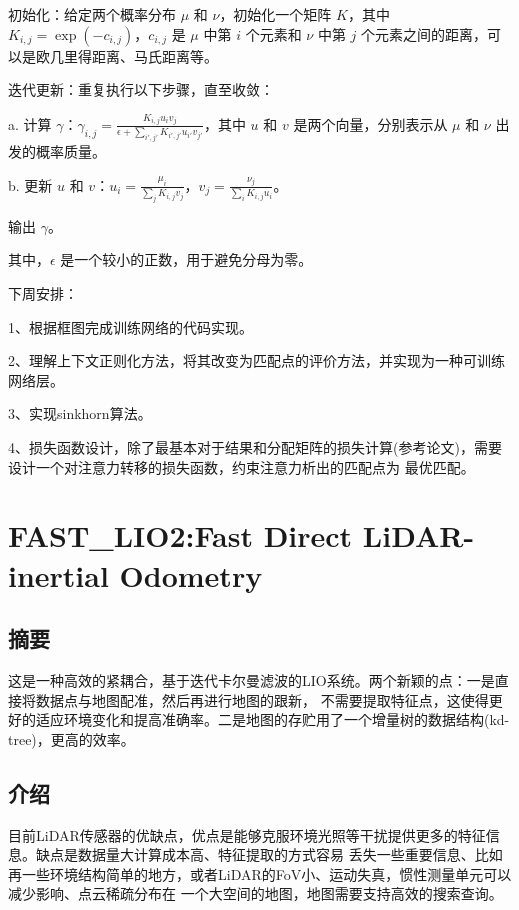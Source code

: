 \documentclass[10pt,a4paper]{article}
\begin{document}
初始化：给定两个概率分布 $\mu$ 和 $\nu$，初始化一个矩阵 $K$，其中 $K_{i,j} = \exp(-c_{i,j})$，$c_{i,j}$ 是 $\mu$ 中第
$i$ 个元素和 $\nu$ 中第 $j$ 个元素之间的距离，可以是欧几里得距离、马氏距离等。

迭代更新：重复执行以下步骤，直至收敛：

\qquad a. 计算 $\gamma$：$\gamma_{i,j}=\frac{K_{i,j}u_i v_j}{\epsilon+\sum_{i',j'}K_{i',j'}u_{i'}v_{j'}}$，其中 $u$ 和
 $v$ 是两个向量，分别表示从 $\mu$ 和 $\nu$ 出发的概率质量。

\qquad b. 更新 $u$ 和 $v$：$u_i=\frac{\mu_i}{\sum_j K_{i,j}v_j}$，$v_j=\frac{\nu_j}{\sum_i K_{i,j}u_i}$。

输出 $\gamma$。

其中，$\epsilon$ 是一个较小的正数，用于避免分母为零。

下周安排：

1、根据框图完成训练网络的代码实现。

2、理解上下文正则化方法，将其改变为匹配点的评价方法，并实现为一种可训练网络层。

3、实现sinkhorn算法。

4、损失函数设计，除了最基本对于结果和分配矩阵的损失计算(参考论文)，需要设计一个对注意力转移的损失函数，约束注意力析出的匹配点为
最优匹配。

\section{FAST_LIO2:Fast Direct LiDAR-inertial Odometry}
\subsection{摘要}
这是一种高效的紧耦合，基于迭代卡尔曼滤波的LIO系统。两个新颖的点：一是直接将数据点与地图配准，然后再进行地图的跟新，
不需要提取特征点，这使得更好的适应环境变化和提高准确率。二是地图的存贮用了一个增量树的数据结构(kd-tree)，更高的效率。
\subsection{介绍}
目前LiDAR传感器的优缺点，优点是能够克服环境光照等干扰提供更多的特征信息。缺点是数据量大计算成本高、特征提取的方式容易
丢失一些重要信息、比如再一些环境结构简单的地方，或者LiDAR的FoV小、运动失真，惯性测量单元可以减少影响、点云稀疏分布在
一个大空间的地图，地图需要支持高效的搜索查询。
\end{document}
